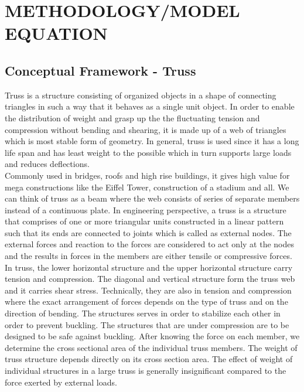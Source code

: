 
\chapter{METHODOLOGY/MODEL EQUATION}


\section{{\bf{Conceptual Framework - Truss}}}
    Truss is a structure consisting of organized objects in a shape of connecting triangles in such a way that it behaves as a single unit object. In order to enable the distribution of weight and grasp up the the fluctuating tension and compression without bending and shearing, it is made up of a web of triangles which is most stable form of geometry. In general, truss is used since it has a long life span and has least weight to the possible which in turn supports large loads and reduces deflections.\\

Commonly used in bridges, roofs and high rise buildings, it gives high value for mega constructions like the Eiffel Tower, construction of a stadium and all. We can think of truss as a beam where the web consists of series of separate members instead of a continuous plate. In engineering perspective, a truss is a structure that comprises of one or more triangular units constructed in a linear pattern such that its ends are connected to joints which is called as external nodes. The external forces and reaction to the forces are considered to act only at the nodes and the results in forces in the members are either tensile or compressive forces. In truss, the lower horizontal structure and the upper horizontal structure carry tension and compression. The diagonal and vertical structure form the truss web and it carries shear stress. Technically, they are also in tension and compression where the exact arrangement of forces depends on the type of truss and on the direction of bending. The structures serves in order to stabilize each other in order to prevent buckling. The structures that are under compression are to be designed to be safe against buckling. After knowing the force on each member, we determine the cross sectional area of the individual truss members. The weight of truss structure depends directly on its cross section area. The effect of weight of individual structures in a large truss is generally insignificant compared to the force exerted by external loads.\\

